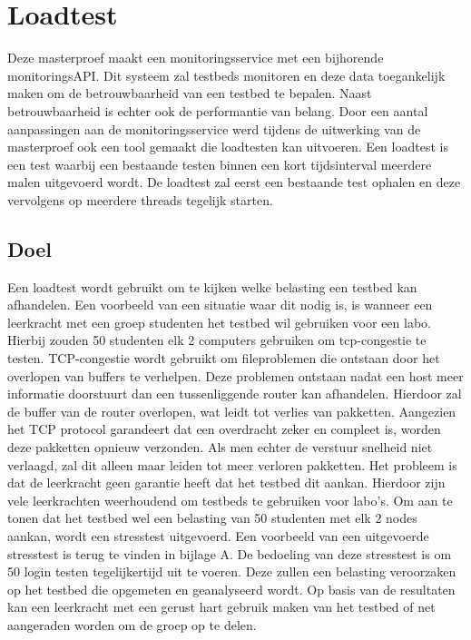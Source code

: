 \chapter{Loadtest}
{\samenvatting Deze masterproef maakt een monitoringsservice met een bijhorende monitoringsAPI. Dit systeem zal testbeds monitoren en deze data toegankelijk maken om de betrouwbaarheid van een testbed te bepalen. Naast betrouwbaarheid is echter ook de performantie van belang. Door een aantal aanpassingen aan de monitoringsservice werd tijdens de uitwerking van de masterproef ook een tool gemaakt die loadtesten kan uitvoeren. Een loadtest is een test waarbij een bestaande testen binnen een kort tijdsinterval meerdere malen uitgevoerd wordt. De loadtest zal eerst een bestaande test ophalen en deze vervolgens op meerdere threads tegelijk starten.}
\section{Doel}
\npar
Een loadtest wordt gebruikt om te kijken welke belasting een testbed kan afhandelen. Een voorbeeld van een situatie waar dit nodig is, is wanneer een leerkracht met een groep studenten het testbed wil gebruiken voor een labo. Hierbij zouden 50 studenten elk 2 computers gebruiken om tcp-congestie te testen. TCP-congestie wordt gebruikt om fileproblemen die ontstaan door het overlopen van buffers te verhelpen. Deze problemen ontstaan nadat een host meer informatie doorstuurt dan een tussenliggende router kan afhandelen. Hierdoor zal de buffer van de router overlopen, wat leidt tot verlies van pakketten. Aangezien het TCP protocol garandeert dat een overdracht zeker en compleet is, worden deze pakketten opnieuw verzonden. Als men echter de verstuur snelheid niet verlaagd, zal dit alleen maar leiden tot meer verloren pakketten.
\clearpage
\npar
Het probleem is dat de leerkracht geen garantie heeft dat het testbed dit aankan. Hierdoor zijn vele leerkrachten weerhoudend om testbeds te gebruiken voor labo's.
Om aan te tonen dat het testbed wel een belasting van 50 studenten met elk 2 nodes aankan, wordt een stresstest uitgevoerd. Een voorbeeld van een uitgevoerde stresstest is terug te vinden in bijlage A. De bedoeling van deze stresstest is om 50 login testen tegelijkertijd uit te voeren. Deze zullen een belasting veroorzaken op het testbed die opgemeten en geanalyseerd wordt. Op basis van de resultaten kan een leerkracht met een gerust hart gebruik maken van het testbed of net aangeraden worden om de groep op te delen.

